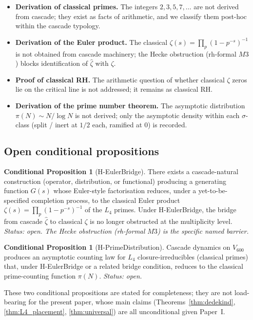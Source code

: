 \documentclass[11pt,a4paper]{article}
\theoremstyle{definition}
\newtheorem{conditional}[theorem]{Conditional Proposition}
\theoremstyle{remark}
\begin{document}
\begin{itemize}\itemsep0pt
  \item \textbf{Derivation of classical primes.} The integers $2, 3, 5, 7, \ldots$ are not derived from cascade; they exist as facts of arithmetic, and we classify them post-hoc within the cascade typology.
  \item \textbf{Derivation of the Euler product.} The classical $\zeta(s) = \prod_p (1 - p^{-s})^{-1}$ is not obtained from cascade machinery; the Hecke obstruction (rh-formal $M3$) blocks identification of $\hat{\zeta}$ with $\zeta$.
  \item \textbf{Proof of classical RH.} The arithmetic question of whether classical $\zeta$ zeros lie on the critical line is not addressed; it remains as classical RH.
  \item \textbf{Derivation of the prime number theorem.} The asymptotic distribution $\pi(N) \sim N / \log N$ is not derived; only the asymptotic density within each $\sigma$-class (split / inert at $1/2$ each, ramified at $0$) is recorded.
\end{itemize}

\subsection{Open conditional propositions}

\begin{conditional}[H-EulerBridge]\label{cond:euler}
There exists a cascade-natural construction (operator, distribution, or
functional) producing a generating function $G(s)$ whose Euler-style
factorisation reduces, under a yet-to-be-specified completion process,
to the classical Euler product $\zeta(s) = \prod_p (1 - p^{-s})^{-1}$
of the $L_4$ primes. Under H-EulerBridge, the bridge from cascade $\hat{\zeta}$
to classical $\zeta$ is no longer obstructed at the multiplicity level.
\emph{Status: open. The Hecke obstruction (rh-formal $M3$) is the
specific named barrier.}
\end{conditional}

\begin{conditional}[H-PrimeDistribution]\label{cond:distribution}
Cascade dynamics on $V_{600}$ produces an asymptotic counting law for
$L_4$ closure-irreducibles (classical primes) that, under
H-EulerBridge or a related bridge condition, reduces to the classical
prime-counting function $\pi(N)$. \emph{Status: open.}
\end{conditional}

These two conditional propositions are stated for completeness; they are
not load-bearing for the present paper, whose main claims
(Theorems~\ref{thm:dedekind}, \ref{thm:L4_placement},
\ref{thm:universal}) are all unconditional given Paper~I.
\end{document}
